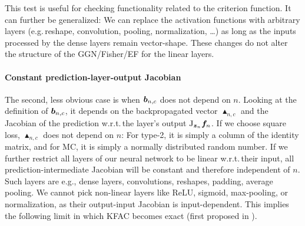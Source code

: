 This test is useful for checking functionality related to the criterion function.
It can further be generalized: We can replace the activation functions with arbitrary layers (e.g.\,reshape, convolution, pooling, normalization, \dots) as long as the inputs processed by the dense layers remain vector-shape.
These changes do not alter the structure of the GGN/Fisher/EF for the linear layers.

\paragraph{Constant prediction-layer-output Jacobian} The second, less obvious case is when ${\bm{b}}_{n,c}$ does not depend on $n$.
Looking at the definition of ${\bm{b}}_{n,c}$, it depends on the backpropagated vector $\blacktriangle_{n,c}$ and the Jacobian of the prediction w.r.t.\,the layer's output $\mathrm{J}_{{\bm{z}}_n} {\bm{f}}_n$.
If we choose square loss, $\blacktriangle_{n,c}$ does not depend on $n$: For type-2, it is simply a column of the identity matrix, and for MC, it is simply a normally distributed random number.
If we further restrict all layers of our neural network to be linear w.r.t.\,their input, all prediction-intermediate Jacobian will be constant and therefore independent of $n$.
Such layers are e.g., dense layers, convolutions, reshapes, padding, average pooling.
We cannot pick non-linear layers like ReLU, sigmoid, max-pooling, or normalization, as their output-input Jacobian is input-dependent. This implies the following limit in which KFAC becomes exact (first proposed in \cite{bernacchia2018exact}).


